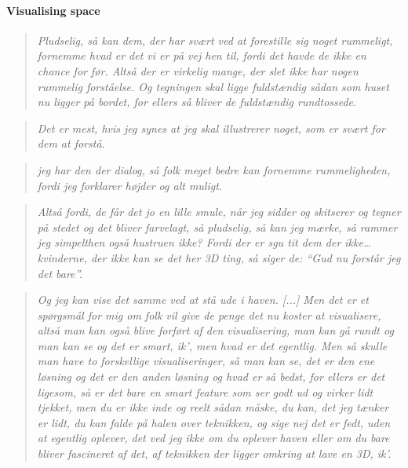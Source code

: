 \paragraph*{Visualising space}

\begin{quote}
	\textit{Pludselig, så kan dem, der har svært ved at forestille sig noget rummeligt, fornemme hvad er det vi er på vej hen til, fordi det havde de ikke en chance for før. Altså der er virkelig mange, der slet ikke har nogen rummelig forståelse. Og tegningen skal ligge fuldstændig sådan som huset nu ligger på bordet, for ellers så bliver de fuldstændig rundtossede}\label{quote:expertRoom1Danish}.\\
\end{quote}

\begin{quote}
	\textit{Det er mest, hvis jeg synes at jeg skal illustrerer noget, som er svært for dem at forstå.}\label{quote:expertRoom2Danish}\\
\end{quote}

\begin{quote}
	\textit{jeg har den der dialog, så folk meget bedre kan fornemme rummeligheden, fordi jeg forklarer højder og alt muligt.}\label{quote:expertRoom4Danish}\\
\end{quote}

\begin{quote}
	\textit{Altså fordi, de får det jo en lille smule, når jeg sidder og skitserer og tegner på stedet og det bliver farvelagt, så pludselig, så kan jeg mærke, så rammer jeg simpelthen også hustruen ikke? Fordi der er sgu tit dem der ikke… kvinderne, der ikke kan se det her 3D ting, så siger de: “Gud nu forstår jeg det bare”.}\label{quote:expertRoom3Danish}\\
\end{quote}

\begin{quote}
	\textit{Og jeg kan vise det samme ved at stå ude i haven. [...] Men det er et spørgsmål for mig om folk vil give de penge det nu koster at visualisere, altså man kan også blive forført af den visualisering, man kan gå rundt og man kan se og det er smart, ik’, men hvad er det egentlig. Men så skulle man have to forskellige visualiseringer, så man kan se, det er den ene løsning og det er den anden løsning og hvad er så bedst, for ellers er det ligesom, så er det bare en smart feature som ser godt ud og virker lidt tjekket, men du er ikke inde og reelt sådan måske, du kan, det jeg tænker er lidt, du kan falde på halen over teknikken, og sige nej det er fedt, uden at egentlig oplever, det ved jeg ikke om du oplever haven eller om du bare bliver fascineret af det, af teknikken der ligger omkring at lave en 3D, ik’.}\label{quote:expertRoom5Danish}\\
\end{quote}



